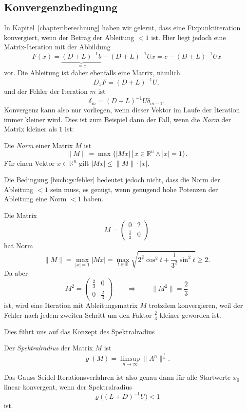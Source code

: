 %
%
\subsection{Konvergenzbedingung
\label{buch:subsection:konvergenzbedingung}}
In Kapitel~\ref{chapter:berechnung} haben wir gelernt, dass eine
Fixpunktiteration konvergiert, wenn der Betrag der Ableitung $<1$ ist.
Hier liegt jedoch eine Matrix-Iteration mit der Abbildung
\[
F(x)
=
\underbrace{(D+L)^{-1} b}_{\displaystyle=c} - (D+L)^{-1}U x
=
c - (D+L)^{-1}Ux
\]
vor.
Die Ableitung ist daher ebenfalls eine Matrix, nämlich
\[
D_xF = (D+L)^{-1}U,
\]
und der Fehler der Iteration $m$ ist
\begin{equation}
\delta_m = (D+L)^{-1}U \delta_{m-1}.
\label{buch:gs:fehler}
\end{equation}
Konvergenz kann also nur vorliegen, wenn dieser Vektor im Laufe der
Iteration immer kleiner wird.
Dies ist zum Beispiel dann der Fall, wenn die {\em Norm} der Matrix
kleiner als $1$ ist:

\begin{definition}
Die {\em Norm} einer Matrix $M$ ist
\[
\|M\|
=
\max\{|Mx|\,|\, x\in\mathbb R^n\wedge |x|=1\}.
\]
Für einen Vektor $x\in\mathbb R^n$ gilt $|Mx| \le \|M\|\cdot |x|$.
\end{definition}

Die Bedingung \eqref{buch:gs:fehler} bedeutet jedoch nicht,
dass die Norm der Ableitung $<1$ sein muss, es genügt, wenn
genügend hohe Potenzen der Ableitung eine Norm $<1$ haben.

\begin{beispiel}
Die Matrix
\[
M=\begin{pmatrix}
0&2\\
\frac13&0
\end{pmatrix}
\]
hat Norm
\[
\|M\|
=
\max_{|x|=1} |Mx| 
=
\max_{t\in\mathbb R} \sqrt{2^2\cos^2 t +\frac1{3^2}\sin^2t} \ge 2.
\]
Da aber
\[
M^2 = \begin{pmatrix}
\frac{2}{3}&0\\
0&\frac{2}{3}
\end{pmatrix}
\qquad\Rightarrow\qquad \|M^2\|=\frac23
\]
ist, wird eine Iteration mit Ableitungsmatrix $M$ trotzdem
konvergieren, weil der Fehler nach jedem zweiten Schritt um den
Faktor $\frac23$ kleiner geworden ist.
\end{beispiel}

Dies führt uns auf das Konzept des Spektralradius

\begin{definition}
Der {\em Spektralradius} der Matrix $M$ ist
\[
\varrho(M)
=
\limsup_{n\to\infty} \|A^n\|^\frac1n.
\]
\end{definition}

Das Gauss-Seidel-Iterationsverfahren ist also genau dann für alle
Startwerte $x_0$ linear konvergent, wenn der Spektralradius
\[
\varrho\bigl( (L+D)^{-1}U \bigr) < 1
\]
ist.


